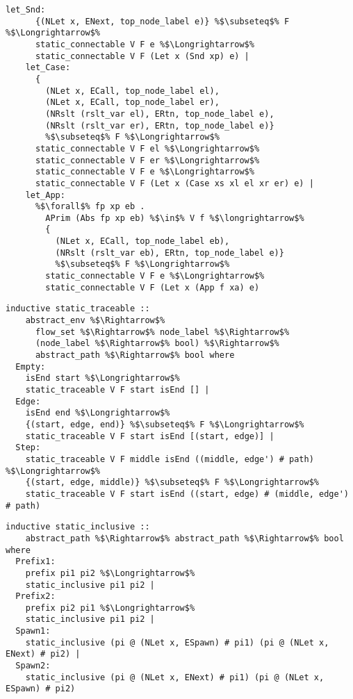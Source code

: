 \documentclass{article}
\begin{document}
\begin{lstlisting}[style=codestyle1, escapechar=\%]
    let_Snd:
      {(NLet x, ENext, top_node_label e)} %$\subseteq$% F %$\Longrightarrow$%
      static_connectable V F e %$\Longrightarrow$%
      static_connectable V F (Let x (Snd xp) e) |
    let_Case:
      {
        (NLet x, ECall, top_node_label el),
        (NLet x, ECall, top_node_label er),
        (NRslt (rslt_var el), ERtn, top_node_label e),
        (NRslt (rslt_var er), ERtn, top_node_label e)}
        %$\subseteq$% F %$\Longrightarrow$%
      static_connectable V F el %$\Longrightarrow$%
      static_connectable V F er %$\Longrightarrow$%
      static_connectable V F e %$\Longrightarrow$%
      static_connectable V F (Let x (Case xs xl el xr er) e) |
    let_App:
      %$\forall$% fp xp eb .
        APrim (Abs fp xp eb) %$\in$% V f %$\longrightarrow$%
        {
          (NLet x, ECall, top_node_label eb),
          (NRslt (rslt_var eb), ERtn, top_node_label e)}
          %$\subseteq$% F %$\Longrightarrow$%
        static_connectable V F e %$\Longrightarrow$%
        static_connectable V F (Let x (App f xa) e)

  \end{lstlisting}

\begin{lstlisting}[style=codestyle1, escapechar=\%]
  inductive static_traceable ::
    abstract_env %$\Rightarrow$%
      flow_set %$\Rightarrow$% node_label %$\Rightarrow$%
      (node_label %$\Rightarrow$% bool) %$\Rightarrow$%
      abstract_path %$\Rightarrow$% bool where
  Empty:
    isEnd start %$\Longrightarrow$%
    static_traceable V F start isEnd [] |
  Edge:
    isEnd end %$\Longrightarrow$%
    {(start, edge, end)} %$\subseteq$% F %$\Longrightarrow$%
    static_traceable V F start isEnd [(start, edge)] |
  Step:
    static_traceable V F middle isEnd ((middle, edge') # path) %$\Longrightarrow$%
    {(start, edge, middle)} %$\subseteq$% F %$\Longrightarrow$%
    static_traceable V F start isEnd ((start, edge) # (middle, edge') # path)
  \end{lstlisting}

\begin{lstlisting}[style=codestyle1, escapechar=\%]
  inductive static_inclusive ::
    abstract_path %$\Rightarrow$% abstract_path %$\Rightarrow$% bool where
  Prefix1:
    prefix pi1 pi2 %$\Longrightarrow$%
    static_inclusive pi1 pi2 |
  Prefix2:
    prefix pi2 pi1 %$\Longrightarrow$%
    static_inclusive pi1 pi2 |
  Spawn1:
    static_inclusive (pi @ (NLet x, ESpawn) # pi1) (pi @ (NLet x, ENext) # pi2) |
  Spawn2:
    static_inclusive (pi @ (NLet x, ENext) # pi1) (pi @ (NLet x, ESpawn) # pi2)
  \end{lstlisting}
\end{document}
